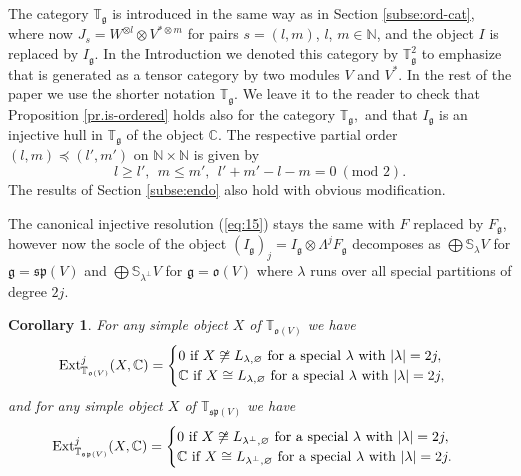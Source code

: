 \documentclass[11pt]{article}
\theoremstyle{plain}
\newtheorem{corollary}[lemma]{Corollary}
\theoremstyle{nonumberplain}
\theoremstyle{plain}
\numberwithin{equation}{section}
\theoremstyle{nonumberplain}
\newcommand\bC{{\mathbb C}}
\newcommand\bN{{\mathbb N}}
\newcommand\bS{{\mathbb S}}
\newcommand\bT{{\mathbb T}}
\newcommand\fg{{\mathfrak g}}
\newcommand\fo{{\mathfrak o}}
\newcommand\fp{{\mathfrak p}}
\newcommand\fs{{\mathfrak s}}
\newcommand\1{{\bf 1}}
\begin{document}
The category $\bT_{\fg}$ is introduced in the same way as in Section \ref{subse:ord-cat}, where now $J_s=W^{\otimes l} \otimes V^{*\otimes m}$ for pairs $s=(l,m)$, $l$, $m\in\bN$, and the object $I$ is replaced by $I_{\fg}$. In the Introduction we denoted this category by $\bT^2_{\fg}$ to emphasize that is generated as a tensor category by two modules $V$ and $V^*$. In the rest of the paper we use the shorter notation $\bT_{\fg}$. We leave it to the reader to check that Proposition \ref{pr.is-ordered} holds also for the category $\bT_{\fg},$  and that $I_{\fg}$ is an injective hull in $\bT_{\fg}$ of the object $\bC$. The respective partial order $(l,m)\preceq (l',m')$ on $\bN\times\bN$ is given by $$l\geq l', \:\:  m\leq m', \:\: l' +m' -l-m = 0 \: (\text{mod 2}). $$ The results of Section \ref{subse:endo} also hold with obvious modification.

The canonical injective resolution (\ref{eq:15}) stays the same with $F$ replaced by $F_{\fg}$, however now the socle of the object $\left(I_{\fg}\right)_j=I_{\fg}\otimes \Lambda^j F_{\fg} $ decomposes as $\bigoplus  \bS_{\lambda} V$ for $\fg=\fs\fp(V)$ and $\bigoplus  \bS_{\lambda^{\perp}} V$ for $\fg=\fo(V)$ where $\lambda$ runs over all special partitions of degree $2j$.

\begin{corollary}
	For any simple object $X$ of $\bT_{\fo(V)}$ we have \begin{equation*}
	\operatorname{Ext}_{\bT_{\fo(V)}}^j (X,\bC)=\begin{cases}	0 \textup{ if }X\not\cong L_{\lambda,\varnothing} \textup{ for  a special } \lambda\textup{  with } |\lambda|=2j, \\ \bC \textup{ if }X\cong L_{\lambda,\varnothing} \textup{ for  a special } \lambda\textup{  with } |\lambda|=2j,
	\end{cases}
	\end{equation*}
	and for any simple object $X$ of $\bT_{\fs\fp(V)}$ we have \begin{equation*}
	\operatorname{Ext}_{\bT_{\fs\fp(V)}}^j (X,\bC)=\begin{cases}	0 \textup{ if }X\not\cong L_{\lambda^{\perp},\varnothing} \textup{ for  a special } \lambda\textup{  with } |\lambda|=2j, \\ \bC \textup{ if }X\cong L_{\lambda^{\perp},\varnothing} \textup{ for  a special } \lambda\textup{  with } |\lambda|=2j.
	\end{cases}
	\end{equation*}
\end{corollary}
\end{document}
